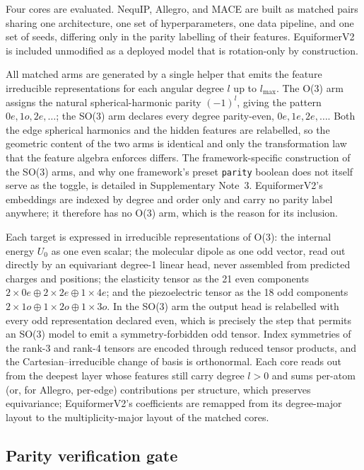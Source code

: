Four cores are evaluated. NequIP, Allegro, and MACE are built as matched pairs sharing one architecture, one set of hyperparameters, one data pipeline, and one set of seeds, differing only in the parity labelling of their features. EquiformerV2 is included unmodified as a deployed model that is rotation-only by construction.

All matched arms are generated by a single helper that emits the feature irreducible representations for each angular degree $l$ up to $l_{\max}$. The O(3) arm assigns the natural spherical-harmonic parity $(-1)^{l}$, giving the pattern $0e, 1o, 2e, \dots$; the SO(3) arm declares every degree parity-even, $0e, 1e, 2e, \dots$. Both the edge spherical harmonics and the hidden features are relabelled, so the geometric content of the two arms is identical and only the transformation law that the feature algebra enforces differs. The framework-specific construction of the SO(3) arms, and why one framework's preset \texttt{parity} boolean does not itself serve as the toggle, is detailed in Supplementary Note~3. EquiformerV2's embeddings are indexed by degree and order only and carry no parity label anywhere; it therefore has no O(3) arm, which is the reason for its inclusion.

Each target is expressed in irreducible representations of O(3): the internal energy $U_0$ as one even scalar; the molecular dipole as one odd vector, read out directly by an equivariant degree-1 linear head, never assembled from predicted charges and positions; the elasticity tensor as the 21 even components $2\times0e \oplus 2\times2e \oplus 1\times4e$; and the piezoelectric tensor as the 18 odd components $2\times1o \oplus 1\times2o \oplus 1\times3o$. In the SO(3) arm the output head is relabelled with every odd representation declared even, which is precisely the step that permits an SO(3) model to emit a symmetry-forbidden odd tensor. Index symmetries of the rank-3 and rank-4 tensors are encoded through reduced tensor products, and the Cartesian--irreducible change of basis is orthonormal. Each core reads out from the deepest layer whose features still carry degree $l>0$ and sums per-atom (or, for Allegro, per-edge) contributions per structure, which preserves equivariance; EquiformerV2's coefficients are remapped from its degree-major layout to the multiplicity-major layout of the matched cores.

\subsection*{Parity verification gate}

